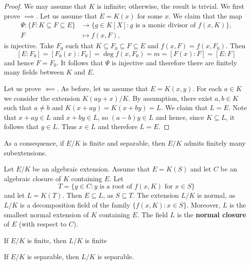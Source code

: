 \begin{proof}
     We may assume that $K$ is infinite; otherwise, the result is trivial. 
    We first prove $\implies$. 
    Let us 
    assume that $E=K(x)$ for some $x$. We claim that the map
    \begin{align*}
    \Psi\colon \{F:K\subseteq F\subseteq E\}&\to\{g\in K[X]:g\text{ is a monic divisor of $f(x,K)$}\},\\
    F&\mapsto f(x,F),
    \end{align*}
    is injective. 
    Take $F_0$ such that $K\subseteq F_0\subseteq F\subseteq E$ and  
    $f(x,F)=f(x,F_0)$. Then  
    \[
    [E:F_0]=[F_0(x):F_0]=\deg f(x,F_0)=m=[F(x):F]=[E:F]
    \]
    and hence $F=F_0$. It follows that $\Psi$ is injective 
    and therefore there are finitely many fields between $K$ and $E$. 
    
    Let us prove $\impliedby$.  
    As before, let us assume that $E=K(x,y)$. For each $a\in K$ we consider
    the extension $K(ay+x)/K$. By assumption, there exist $a,b\in K$ such that
    $a\ne b$ and $K(x+ay)=K(x+by)=L$. We claim that $L=E$. Note that 
    $x+ay\in L$ and $x+by\in L$, so $(a-b)y\in L$ and hence, since $K\subseteq L$, it follows that
    $y\in L$. Thus $x\in L$ and therefore $L=E$. 
\end{proof}

As a consequence, if $E/K$ is finite and separable, then $E/K$ admits
finitely many subextensions. 


Let $E/K$ be an algebraic extension. Assume that $E=K(S)$ and
let $C$ be an algebraic closure of $K$ containing $E$. Let 
\[
T=\{y\in C:y\text{ is a root of $f(x,K)$ for $x\in S$}\}
\]
and let $L=K(T)$. Then $E\subseteq L$, as $S\subseteq T$. The extension
$L/K$ is normal, as $L/K$ is a decomposition field of the family $\{f(x,K):x\in S\}$. 
Moreover, $L$ is the smallest normal extension of $K$ containing $E$. The field
$L$ is the \textbf{normal closure} of $E$ (with respect to $C$). 

\begin{exercise}
If $E/K$ is finite, then $L/K$ is finite
\end{exercise}

\begin{exercise}
If $E/K$ is separable, then $L/K$ is separable.
\end{exercise}

